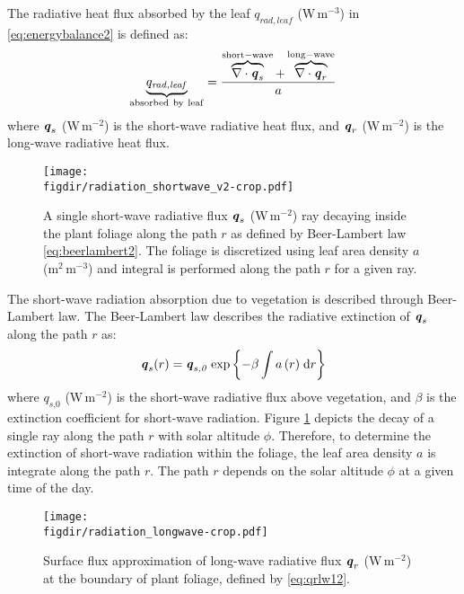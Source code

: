 The radiative heat flux absorbed by the leaf ${q_{\mathit{rad,leaf}}}$ (W\,m$^{-3}$) in \cref{eq:energybalance2} is defined as:
\begin{equation}
\underbrace{q_{\mathit{rad,leaf}}}_{\mathrm{absorbed\ by\ leaf}} = \frac {\overbrace{\nabla  \cdot \mvec{q}_s}^{\mathrm{short-wave}} + \overbrace{\nabla  \cdot \mvec{q}_r}^{\mathrm{long-wave}}}{a}
\label{eq:qradleaf2}
\end{equation}
where $\textbf{\textit{q}}_s$ (W\,m$^{-2}$) is the short-wave radiative heat flux, and $\textbf{\textit{q}}_r$ (W\,m$^{-2}$) is the long-wave radiative heat flux. 

\begin{figure}[t]
	\centering
	\texttt{[image: \\figdir/radiation\_shortwave\_v2-crop.pdf]}
	\caption{A single short-wave radiative flux $\textbf{\textit{q}}_s$ (W\,m$^{-2}$) ray decaying inside the plant foliage along the path $r$ as defined by Beer-Lambert law  \cref{eq:beerlambert2}. The foliage is discretized using leaf area density $a$ (m$^2$\,m$^{-3}$) and integral is performed along the path $r$ for a given ray.}
	\label{fig:radiation_shortwave}
\end{figure}


The short-wave radiation absorption due to vegetation is described through Beer-Lambert law. The Beer-Lambert law describes the radiative extinction of $\textbf{\textit{q}}_s$ along the path $r$ as:
\begin{equation}
\textbf{\textit{q}}_s(r) = \textbf{\textit{q}}_{\textit{s,0}}\,\exp\left\{ - \beta \int{a\left( r \right)} \;\mathrm{d}r \right\}
\label{eq:beerlambert2}
\end{equation}
where $q_{\textit{s,0}}$ (W\,m$^{-2}$) is the short-wave radiative flux above vegetation, and $\beta$ is the extinction coefficient for short-wave radiation. Figure \cref{fig:radiation_shortwave} depicts the decay of a single ray along the path $r$ with solar altitude $\phi$. Therefore, to determine the extinction of short-wave radiation within the foliage, the leaf area density $a$ is integrate along the path $r$. The path $r$ depends on the solar altitude $\phi$ at a given time of the day.

	\begin{figure}[t]
		\centering
		\texttt{[image: \\figdir/radiation\_longwave-crop.pdf]}
		\caption{Surface flux approximation of long-wave radiative flux $\textbf{\textit{q}}_r$ (W\,m$^{-2}$) at the boundary of plant foliage, defined by \cref{eq:qrlw12}.}
		\label{fig:radiation_longwave}
	\end{figure}

